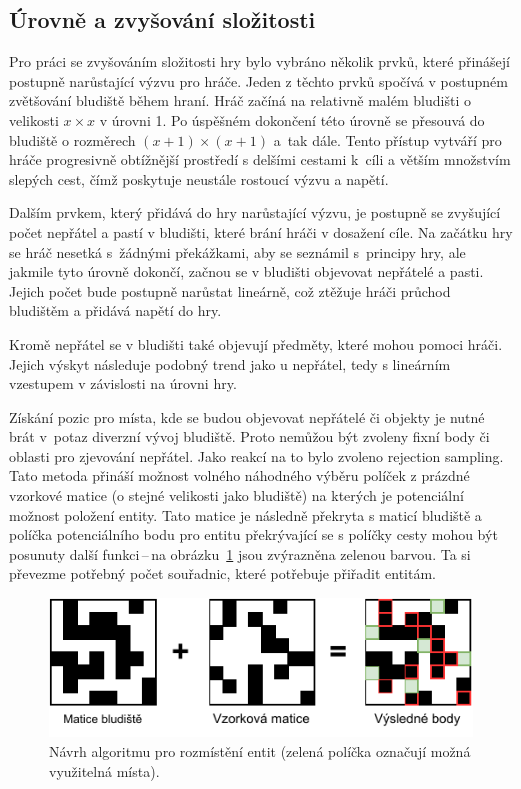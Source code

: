 \subsection*{Úrovně a zvyšování složitosti}
Pro práci se zvyšováním složitosti hry bylo vybráno několik prvků, které přinášejí postupně narůstající výzvu pro hráče. Jeden z těchto prvků spočívá v postupném zvětšování bludiště během hraní. Hráč začíná na relativně malém bludišti o velikosti $x \times x$ v úrovni 1. Po úspěšném dokončení této úrovně se přesouvá do bludiště o rozměrech $(x + 1) \times (x + 1)$ a~tak dále. Tento přístup vytváří pro hráče progresivně obtížnější prostředí s delšími cestami k~cíli a větším množstvím slepých cest, čímž poskytuje neustále rostoucí výzvu a napětí.

Dalším prvkem, který přidává do hry narůstající výzvu, je postupně se zvyšující počet nepřátel a pastí v bludišti, které brání hráči v dosažení cíle. Na začátku hry se hráč nesetká s~žádnými překážkami, aby se seznámil s~principy hry, ale jakmile tyto úrovně dokončí, začnou se v bludišti objevovat nepřátelé a pasti. Jejich počet bude postupně narůstat lineárně, což ztěžuje hráči průchod bludištěm a přidává napětí do hry.

Kromě nepřátel se v bludišti také objevují předměty, které mohou pomoci hráči. Jejich výskyt následuje podobný trend jako u nepřátel, tedy s lineárním vzestupem v závislosti na úrovni hry.

Získání pozic pro místa, kde se budou objevovat nepřátelé či objekty je nutné brát v~potaz diverzní vývoj bludiště. Proto nemůžou být zvoleny fixní body či oblasti pro zjevování nepřátel. Jako reakcí na to bylo zvoleno rejection sampling. Tato metoda přináší možnost volného náhodného výběru políček z prázdné vzorkové matice (o stejné velikosti jako bludiště) na kterých je potenciální možnost položení entity. Tato matice je následně překryta s maticí bludiště a políčka potenciálního bodu pro entitu překrývající se s políčky cesty mohou být posunuty další funkci\,--\,na obrázku~\ref{fig:rozmisteni_rs} jsou zvýrazněna zelenou barvou. Ta si převezme potřebný počet souřadnic, které potřebuje přiřadit entitám.

\begin{figure}[hb]
    \centering
    \includegraphics[width=\textwidth]{obrazky-figures/ch3/rozmisteni_rs.pdf}
    \caption{Návrh algoritmu pro rozmístění entit (zelená políčka označují možná využitelná místa).}
    \label{fig:rozmisteni_rs}
\end{figure}


